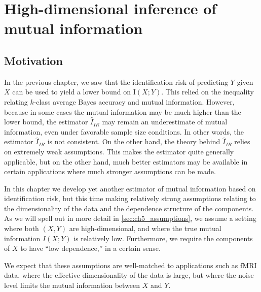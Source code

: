 
\chapter{High-dimensional inference of mutual information} %

\label{Chapter5} %

\section{Motivation}

In the previous chapter, we saw that the identification risk of
predicting $Y$ given $X$ can be used to yield a lower bound on
$\text{I}(X; Y)$.  This relied on the inequality relating $k$-class
average Bayes accuracy and mutual information.  However, because in
some cases the mutual information may be much higher than the lower
bound, the estimator $\hat{I}_{IR}$ may remain an underestimate of
mutual information, even under favorable sample size conditions.  In
other words, the estimator $\hat{I}_{IR}$ is not consistent.  On the
other hand, the theory behind $\hat{I}_{IR}$ relies on extremely weak
assumptions.  This makes the estimator quite generally applicable, but
on the other hand, much better estimators may be available in certain
applications where much stronger assumptions can be made.

In this chapter we develop yet another estimator of mutual information
based on identification risk, but this time making relatively strong
assumptions relating to the dimensionality of the data and the
dependence structure of the components.  As we will spell out in more
detail in \ref{sec:ch5_assumptions}, we assume a setting where both
$(X, Y)$ are high-dimensional, and where the true mutual information
$I(X; Y)$ is relatively low.  Furthermore, we require the components
of $X$ to have ``low dependence,'' in a certain sense.

We expect that these assumptions are well-matched to applications such
as fMRI data, where the effective dimensionality of the data is large,
but where the noise level limits the mutual information between $X$
and $Y$.

